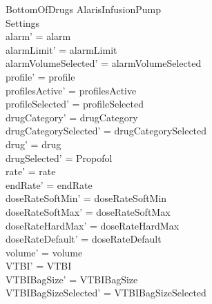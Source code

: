 \begin{schema}{BottomOfDrugs}
	\Delta AlarisInfusionPump\\
	 Settings\\
	\where
	alarm' = alarm\\
	alarmLimit' = alarmLimit\\
	alarmVolumeSelected' = alarmVolumeSelected\\
	\pagebreak
	profile' = profile\\
	profilesActive' = profilesActive\\  
	  profileSelected' = profileSelected\\
	drugCategory' = drugCategory\\ drugCategorySelected' = drugCategorySelected\\
	drug' = drug\\ 
	drugSelected' = Propofol\\
	rate' = rate\\
	endRate' = endRate\\
	doseRateSoftMin' = doseRateSoftMin\\
	doseRateSoftMax' = doseRateSoftMax\\
	doseRateHardMax' = doseRateHardMax\\
	doseRateDefault' = doseRateDefault\\
	volume' = volume\\
	VTBI' = VTBI\\
	VTBIBagSize' = VTBIBagSize\\ VTBIBagSizeSelected' = VTBIBagSizeSelected\\

\end{schema}
